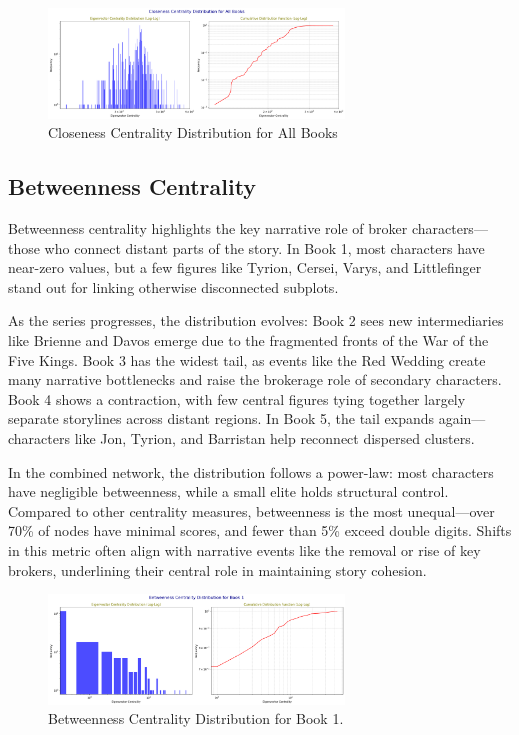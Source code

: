 \documentclass[12pt, a4paper]{article}
\begin{document}
	\begin{figure}[htbp]
		\centering
		\includegraphics[width=0.7\textwidth]{closeness-distrib-all-books.png}
		\caption{Closeness Centrality Distribution for All Books}
		\label{fig:closeness-distrib}
	\end{figure}
	
	\subsection*{Betweenness Centrality}
	
	Betweenness centrality highlights the key narrative role of broker characters—those who connect distant parts of the story. In Book 1, most characters have near-zero values, but a few figures like Tyrion, Cersei, Varys, and Littlefinger stand out for linking otherwise disconnected subplots.
	
	As the series progresses, the distribution evolves: Book 2 sees new intermediaries like Brienne and Davos emerge due to the fragmented fronts of the War of the Five Kings. Book 3 has the widest tail, as events like the Red Wedding create many narrative bottlenecks and raise the brokerage role of secondary characters. Book 4 shows a contraction, with few central figures tying together largely separate storylines across distant regions. In Book 5, the tail expands again—characters like Jon, Tyrion, and Barristan help reconnect dispersed clusters.
	
	In the combined network, the distribution follows a power-law: most characters have negligible betweenness, while a small elite holds structural control. Compared to other centrality measures, betweenness is the most unequal—over 70\% of nodes have minimal scores, and fewer than 5\% exceed double digits. Shifts in this metric often align with narrative events like the removal or rise of key brokers, underlining their central role in maintaining story cohesion.
	
	\begin{figure}[htbp]
		\centering
		\includegraphics[width=0.7\textwidth]{betweenness-distrib-book1.png}
		\caption{Betweenness Centrality Distribution for Book 1.}
		\label{fig:betweennessbook1}
	\end{figure}
      \FloatBarrier
\end{document}
